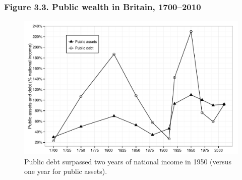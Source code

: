 \documentclass[t]{beamer}\usepackage[]{graphicx}\usepackage[]{color}
\newenvironment{knitrout}{}{} %
\begin{document}
\begin{frame}[label=Figure_3_3]
\frametitle{Figure 3.3. Public wealth in Britain, 1700--2010}
\begin{figure}[t]
\begin{minipage}[b]{\textwidth}
\centering
\begin{knitrout}\footnotesize
{}\color{fgcolor}

{\centering \includegraphics[width=1\linewidth]{figures/bw/Figure_3_3} 

}



\end{knitrout}
\caption{Public debt surpassed two years of national income in 1950 (versus one year for public assets).}
\end{minipage}
\end{figure}
\end{frame}
\end{document}
